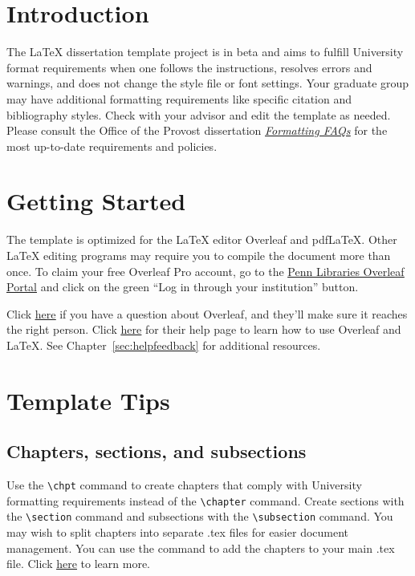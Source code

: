 \section{Introduction}
The LaTeX dissertation template project is in beta and aims to fulfill University format requirements when one follows the instructions, resolves errors and warnings, and does not change the style file or font settings. Your graduate group may have additional formatting requirements like specific citation and bibliography styles. Check with your advisor and edit the template as needed. Please consult the Office of the Provost dissertation \textit{\underline{\href{https://provost.upenn.edu/formatting-faqs}{Formatting FAQs}}} for the most up-to-date requirements and policies.

\section{Getting Started}
The template is optimized for the LaTeX editor Overleaf and pdfLaTeX. Other LaTeX editing programs may require you to compile the document more than once. To claim your free Overleaf Pro account, go to the \underline{\href{https://www.overleaf.com/edu/upenn}{Penn Libraries Overleaf Portal}} and click on the green ``Log in through your institution'' button.

Click \underline{\href{https://www.overleaf.com/contact}{here}} if you have a question about Overleaf, and they'll make sure it reaches the right person. Click \underline{\href{https://www.overleaf.com/help/18-how-do-i-use-overleaf}{here}} for their help page to learn how to use Overleaf and LaTeX. See Chapter~\ref{sec:helpfeedback} for additional resources.

\section{Template Tips}
\subsection{Chapters, sections, and subsections}
Use the \verb|\chpt| command to create chapters that comply with University formatting requirements instead of the \verb|\chapter| command. Create sections with the \verb|\section| command and subsections with the \verb|\subsection| command. You may wish to split chapters into separate .tex files for easier document management. You can use the \verb|| command to add the chapters to your main .tex file. Click \underline{\href{https://www.overleaf.com/learn/latex/Management_in_a_large_project\#Inputting_and_including_files}{here}} to learn more. 

